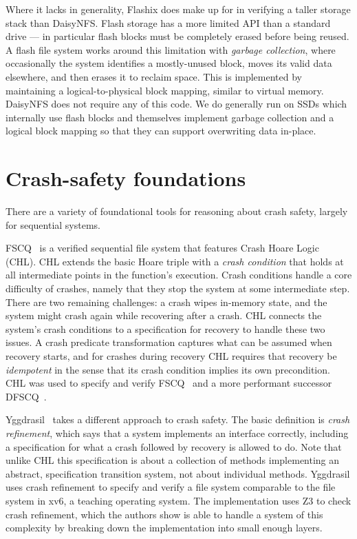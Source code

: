 Where it lacks in generality, Flashix does make up for in verifying a taller
storage stack than DaisyNFS. Flash storage has a more limited API than a
standard drive --- in particular flash blocks must be completely erased before
being reused. A flash file system works around this limitation with \emph{garbage
collection}, where occasionally the system identifies a mostly-unused block,
moves its valid data elsewhere, and then erases it to reclaim space. This is
implemented by maintaining a logical-to-physical block mapping, similar to
virtual memory. DaisyNFS does not require any of this code. We do generally run
on SSDs which internally use flash blocks and themselves implement garbage
collection and a logical block mapping so that they can support overwriting data
in-place.

\section{Crash-safety foundations}

There are a variety of foundational tools for reasoning about crash safety,
largely for sequential systems.

FSCQ~\cite{chen:fscq,chen:dfscq,chen:thesis} is a verified sequential file
system that features Crash Hoare Logic (CHL). CHL extends the basic Hoare triple
with a \emph{crash condition} that holds at all intermediate points in the
function's execution. Crash conditions handle a core difficulty of crashes,
namely that they stop the system at some intermediate step. There are two
remaining challenges: a crash wipes in-memory state, and the system might crash again
while recovering after a crash. CHL connects the system's crash conditions to a
specification for recovery to handle these two issues. A crash predicate
transformation captures what can be assumed when recovery starts, and for
crashes during recovery CHL requires that recovery be \emph{idempotent} in the
sense that its crash condition implies its own precondition. CHL was used to
specify and verify FSCQ~\cite{chen:fscq} and a more performant successor
DFSCQ~\cite{chen:dfscq}.

Yggdrasil~\cite{sigurbjarnarson:yggdrasil} takes a different approach to crash
safety. The basic definition is \emph{crash refinement}, which says that a
system implements an interface correctly, including a specification for what a
crash followed by recovery is allowed to do. Note that unlike CHL this
specification is about a collection of methods implementing an abstract,
specification transition system, not about individual methods. Yggdrasil uses
crash refinement to specify and verify a file system comparable to the file
system in xv6, a teaching operating system. The implementation uses Z3 to check
crash refinement, which the authors show is able to handle a system of this
complexity by breaking down the implementation into small enough layers.

